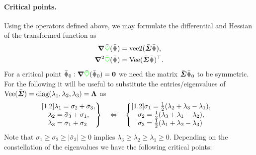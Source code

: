 \paragraph{Critical points.}
Using the operators defined above, we may formulate the differential and Hessian of the transformed function as
\begin{align}
 \differential \bar{\potentialEnergy}(\bar{\R}) &= \veeTwoOp(\bar{\mat{\varSigma}} \bar{\R}),
\\
 \differential^2 \bar{\potentialEnergy}(\bar{\R}) &= \veeMatOp(\bar{\mat{\varSigma}} \bar{\R})^\top.
\end{align}
For a critical point $\bar{\R}_0 : \differential \bar{\potentialEnergy}(\bar{\R}_0)=\tuple{0}$ we need the matrix $\bar{\mat{\varSigma}} \bar{\R}_0$ to be symmetric.
For the following it will be useful to substitute the entries/eigenvalues of $\operatorname{Vee}(\bar{\boldsymbol{\varSigma}}) = \operatorname{diag}(\lambda_1, \lambda_2, \lambda_3) = \boldsymbol{\Lambda}$ as
\begin{align}
 &\left.\begin{matrix}[1.2]
 \lambda_1 = \sigma_2 + \bar{\sigma}_3, \\
 \lambda_2 = \bar{\sigma}_3 + \sigma_1, \\
 \lambda_3 = \sigma_1 + \sigma_2\hphantom{,}  
 \end{matrix}\right\}&
&\Leftrightarrow&
 &\left\{\begin{matrix}[1.2]
 \sigma_1 = \tfrac{1}{2} (\lambda_2 + \lambda_3 - \lambda_1), \\
 \sigma_2 = \tfrac{1}{2} (\lambda_3 + \lambda_1 - \lambda_2), \\
 \bar{\sigma}_3 = \tfrac{1}{2} (\lambda_1 + \lambda_2 - \lambda_3)\hphantom{,}  
 \end{matrix}\right.
\end{align} 
Note that $\sigma_1 \geq \sigma_2 \geq |\bar{\sigma}_3| \geq 0$ implies $\lambda_3 \geq \lambda_2 \geq \lambda_1 \geq 0$.
Depending on the constellation of the eigenvalues we have the following critical points:

